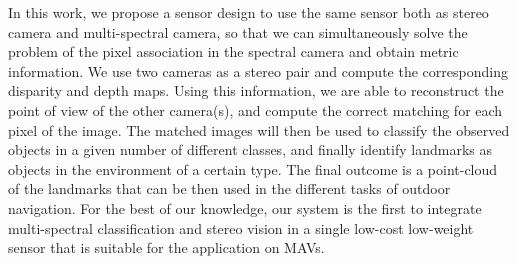 \documentclass[a4paper, 10pt, conference]{ieeeconf}      %
\begin{document}
%
%
%



In this work, we propose a sensor design to use the same sensor both as stereo camera and multi-spectral camera, so that we can simultaneously solve the problem of the pixel association in the spectral camera and obtain metric information.
We use two cameras as a stereo pair and compute the corresponding disparity and depth maps.
Using this information, we are able to reconstruct the point of view of the other camera(s), and compute the correct matching for each pixel of the image.
The matched images will then be used to classify the observed objects in a given number of different classes, and finally identify landmarks as objects in the environment of a certain type.
The final outcome is a point-cloud of the landmarks that can be then used in the different tasks of outdoor navigation.
For the best of our knowledge, our system is the first to integrate multi-spectral classification and stereo vision in a single low-cost low-weight sensor that is suitable for the application on MAVs.
\end{document}
